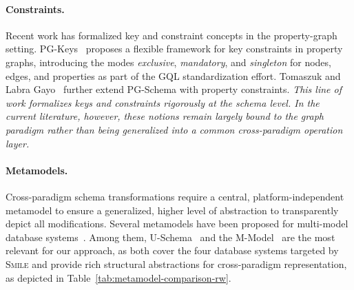 \documentclass{llncs}
\begin{document}
\paragraph{Constraints.}
Recent work has formalized key and constraint concepts in the property-graph setting. PG-Keys~\cite{DBLP:conf/sigmod/AnglesBDFHHLLLM21} proposes a flexible framework for key constraints in property graphs, introducing the modes \emph{exclusive}, \emph{mandatory}, and \emph{singleton} for nodes, edges, and properties as part of the GQL standardization effort. Tomaszuk and Labra Gayo~\cite{DBLP:conf/kcap/TomaszukG25} further extend PG-Schema with property constraints. \textit{This line of work formalizes keys and constraints rigorously at the schema level. In the current literature, however, these notions remain largely bound to the graph paradigm rather than being generalized into a common cross-paradigm operation layer.}

\paragraph{Metamodels.}
Cross-paradigm schema transformations require a central, platform-independent metamodel to ensure a generalized, higher level of abstraction to transparently depict all modifications.
Several metamodels have been proposed for multi-model database systems~\cite{atzeni2020data,abdelhedi2017umltonosql,vanhove2017data,mali2020modeldrivenguide,zdepski2020pddm,candel2022unified,conrad2022metamodels}. Among them, U-Schema~\cite{candel2022unified} and the M-Model~\cite{conrad2022metamodels} are the most relevant for our approach, as both cover the four database systems targeted by \textsc{Smile} and provide rich structural abstractions for cross-paradigm representation, as depicted in Table~\ref{tab:metamodel-comparison-rw}.
\end{document}
